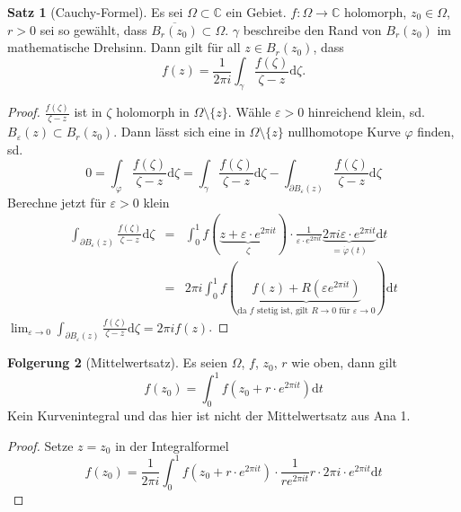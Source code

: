 \documentclass[11pt,titlepage]{article}
\theoremstyle{definition}
\newtheorem{theorem}{Satz}[section]
\newtheorem{corollary}[theorem]{Folgerung}
\theoremstyle{remark}
\begin{document}
	\begin{theorem}[Cauchy-Formel]
		Es sei $\Omega\subset\mathbb{C}$ ein Gebiet. $f:\Omega\to\mathbb{C}$ holomorph, 
		$z_0\in\Omega$, $r>0$ sei so gewählt, dass $\overline{B_r (z_0)}\subset\Omega$. 
		$\gamma$ beschreibe den Rand von $B_r (z_0)$ im mathematische Drehsinn. Dann gilt 
		für all $z\in B_r (z_0)$, dass 
		\[ f(z)= \frac{1}{2 \pi i} \int_{\gamma} \frac{f(\zeta)}{\zeta -z}\mathrm{d}\zeta. \]
	\end{theorem}
	
	\begin{proof}
		$\frac{f(\zeta )}{\zeta -z}$ ist in $\zeta$ holomorph in $\Omega\setminus \{ z\}$. 
		Wähle $\varepsilon >0$ hinreichend klein, sd. $B_{\varepsilon}(z)\subset B_r (z_0)$. 
		Dann lässt sich eine in $\Omega\setminus \{ z \}$ nullhomotope Kurve $\varphi$ finden, sd.
		\[ 0= \int_{\varphi} \frac{f(\zeta)}{\zeta -z}\mathrm{d}\zeta = 
		\int_{\gamma}\frac{f(\zeta)}{\zeta -z} \mathrm{d}\zeta - \int_{\partial B_{\varepsilon}(z) }
		\frac{f(\zeta)}{\zeta - z}\mathrm{d}\zeta \]
		Berechne jetzt für $\varepsilon >0$ klein 
		\begin{eqnarray*}
			\int_{\partial B_{\varepsilon}(z)} \frac{f(\zeta)}{\zeta -z}\mathrm{d}\zeta &=& 
			\int_0^1 f(\underbrace{z+\varepsilon \cdot e^{2\pi it} }_{\zeta})\cdot 
			\frac{1}{\varepsilon \cdot e^{2\pi it}} \underbrace{2\pi i \varepsilon \cdot e^{2 \pi it}}_{=
			\dot{\varphi}(t)} \mathrm{d}t \\
			&=& 2\pi i \int_0^1 f(\underbrace{f(z)+R(\varepsilon e^{2\pi i t})}_{\text{da $f$ stetig ist, gilt 
			$R\to0$ für $\varepsilon\to 0$}})\mathrm{d}t
		\end{eqnarray*}
		$\lim_{\varepsilon\to 0} \int_{\partial B_{\varepsilon} (z)} \frac{f(\zeta)}{\zeta -z} \mathrm{d}\zeta
		=2\pi i f(z)$.
	\end{proof}
	
	\begin{corollary}[Mittelwertsatz]
		Es seien $\Omega$, $f$, $z_0$, $r$ wie oben, dann gilt 
		\[ f(z_0)= \int_0^1 f(z_0+r\cdot e^{2\pi it})\mathrm{d}t \]
		Kein Kurvenintegral und das hier ist nicht der Mittelwertsatz aus Ana 1.
	\end{corollary}
	
	\begin{proof}
		Setze $z=z_0$ in der Integralformel 
		\[ f(z_0)= \frac{1}{2\pi i} \int_0^1 f(z_0+r\cdot e^{2\pi it})\cdot \frac{1}{r e^{2\pi it}} r\cdot 2\pi i \cdot 
		e^{2\pi it}\mathrm{d}t \]
	\end{proof}
	
\end{document}
